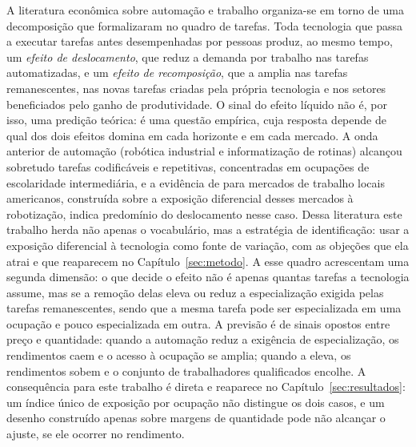A literatura econômica sobre automação e trabalho organiza-se em torno de uma
decomposição que  formalizaram no quadro de tarefas.
Toda tecnologia que passa a executar tarefas antes desempenhadas por pessoas
produz, ao mesmo tempo, um \emph{efeito de deslocamento}, que reduz a demanda
por trabalho nas tarefas automatizadas, e um \emph{efeito de recomposição}, que
a amplia nas tarefas remanescentes, nas novas tarefas criadas pela própria
tecnologia e nos setores beneficiados pelo ganho de produtividade. O sinal do
efeito líquido não é, por isso, uma predição teórica: é uma questão empírica,
cuja resposta depende de qual dos dois efeitos domina em cada horizonte e em
cada mercado. A onda anterior de automação (robótica industrial e
informatização de rotinas) alcançou sobretudo tarefas codificáveis e
repetitivas, concentradas em ocupações de escolaridade intermediária, e a
evidência de  para mercados de trabalho locais
americanos, construída sobre a exposição diferencial desses mercados à
robotização, indica predomínio do deslocamento nesse caso. Dessa literatura este
trabalho herda não apenas o vocabulário, mas a estratégia de identificação: usar
a exposição diferencial à tecnologia como fonte de variação, com as objeções que
ela atrai e que reaparecem no Capítulo~\ref{sec:metodo}. A esse quadro
 acrescentam uma segunda dimensão: o que decide o efeito
não é apenas quantas tarefas a tecnologia assume, mas se a remoção delas eleva
ou reduz a especialização exigida pelas tarefas remanescentes, sendo que a mesma
tarefa pode ser especializada em uma ocupação e pouco especializada em outra. A
previsão é de sinais opostos entre preço e quantidade: quando a automação reduz
a exigência de especialização, os rendimentos caem e o acesso à ocupação se
amplia; quando a eleva, os rendimentos sobem e o conjunto de trabalhadores
qualificados encolhe. A consequência para este trabalho é direta e reaparece no
Capítulo~\ref{sec:resultados}: um índice único de exposição por ocupação não
distingue os dois casos, e um desenho construído apenas sobre margens de
quantidade pode não alcançar o ajuste, se ele ocorrer no rendimento.

